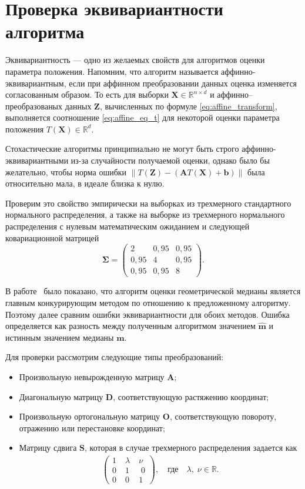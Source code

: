 \section{Проверка эквивариантности алгоритма}

Эквивариантность --- одно из желаемых свойств для алгоритмов оценки параметра положения. Напомним, что алгоритм называется аффинно-эквивариантным, если при аффинном преобразовании данных оценка изменяется согласованным образом. То есть для выборки $\mathbf{X}\in \mathbb{R}^{n\times d}$ и аффинно--преобразованых данных $\mathbf{Z}$, вычисленных по формуле \eqref{eq:affine_transform}, выполняется соотношение \eqref{eq:affine_eq_t} для некоторой оценки параметра положения $T( \mathbf{X}) \in \mathbb{R}^d$.

Стохастические алгоритмы принципиально не могут быть строго аффинно-эквивариантными из-за случайности получаемой оценки, однако было бы желательно, чтобы норма ошибки $\|T( \mathbf{Z}) - (\mathbf{A}T(\mathbf{X}) + \mathbf{b})\|$ была относительно мала, в идеале близка к нулю.

Проверим это свойство эмпирически на выборках из трехмерного стандартного нормального распределения, а также на выборке из трехмерного нормального распределения с нулевым математическим ожиданием и следующей ковариационной матрицей 
\begin{equation}\label{eq:experimentmatrix}
 \boldsymbol{\Sigma}= \begin{pmatrix}
2 & 0{,}95  & 0{,}95\\
0{,}95 & 4 & 0{,}95\\
0{,}95 & 0{,}95 & 8
\end{pmatrix}.
\end{equation}

В работе~\cite{filatova2024robust} было показано, что алгоритм оценки геометрической медианы является главным конкурирующим методом по отношению к предложенному алгоритму. Поэтому далее сравним ошибки эквивариантности для обоих методов. Ошибка определяется как разность между полученным алгоритмом значением $\widehat{\mathbf{m}}$ и истинным значением медианы $\mathbf{m}$.

Для проверки рассмотрим следующие типы преобразований:
\begin{itemize}
    \item Произвольную невырожденную матрицу $\mathbf{A}$;
    \item Диагональную матрицу $\mathbf{D}$, соответствующую растяжению координат;
    \item Произвольную ортогональную матрицу $\mathbf{O}$, соответствующую повороту, отражению или перестановке координат;
    \newpage
    \item Матрицу сдвига $\mathbf{S}$, которая в случае трехмерного распределения задается как
  \begin{align*}
    \begin{pmatrix}
1 \; & \lambda\;   & \nu \\
0 \; & 1 &\;  0 \\
0 \; & 0\;  & 1
\end{pmatrix}, \quad \text{где} \quad \lambda, \; \nu\in\mathbb{R}.
    \end{align*}
\end{itemize}

